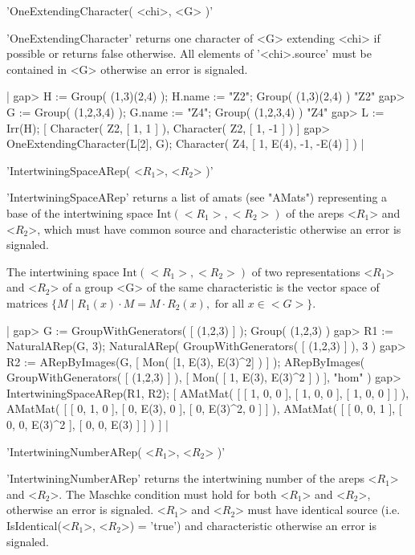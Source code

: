 
'OneExtendingCharacter( <chi>, <G> )'

'OneExtendingCharacter' returns one character 
of <G> extending <chi> if possible or returns false otherwise. 
All elements of '<chi>.source' must be 
contained in <G> otherwise an error is signaled.

|    gap> H := Group( (1,3)(2,4) ); H.name := "Z2";
    Group( (1,3)(2,4) )
    "Z2"
    gap> G := Group( (1,2,3,4) ); G.name := "Z4";
    Group( (1,2,3,4) )
    "Z4"
    gap> L := Irr(H);
    [ Character( Z2, [ 1, 1 ] ), Character( Z2, [ 1, -1 ] ) ]
    gap> OneExtendingCharacter(L[2], G);
    Character( Z4, [ 1, E(4), -1, -E(4) ] ) |


'IntertwiningSpaceARep( <$R_1$>, <$R_2$> )'

'IntertwiningSpaceARep' returns a list of amats (see "AMats") 
representing a base of the intertwining space $\mbox{Int}(<R_1>, <R_2>)$
of the areps <$R_1$> and <$R_2$>, which must have common source
and characteristic otherwise an error is signaled.

The intertwining space $\mbox{Int}(<R_1>, <R_2>)$ of two representations 
<$R_1$> and <$R_2$> of a group <G> of the same characteristic
is the vector space of matrices 
$\{M\mid R_1(x)\cdot M = M \cdot R_2(x),\mbox{ for all }x\in <G>\}$.

|    gap> G := GroupWithGenerators( [ (1,2,3) ] );
    Group( (1,2,3) )
    gap> R1 := NaturalARep(G, 3);
    NaturalARep( GroupWithGenerators( [ (1,2,3) ] ), 3 )
    gap> R2 := ARepByImages(G, [ Mon( [1, E(3), E(3)^2] ) ] );
    ARepByImages(
      GroupWithGenerators( [ (1,2,3) ] ),
      [ Mon( [ 1, E(3), E(3)^2 ] )
      ],
      "hom"
    )
    gap> IntertwiningSpaceARep(R1, R2);
    [ AMatMat( [ [ 1, 0, 0 ], [ 1, 0, 0 ], [ 1, 0, 0 ] ] ), 
      AMatMat( [ [ 0, 1, 0 ], [ 0, E(3), 0 ], [ 0, E(3)^2, 0 ] ] ), 
      AMatMat( [ [ 0, 0, 1 ], [ 0, 0, E(3)^2 ], [ 0, 0, E(3) ] ] ) ] |


'IntertwiningNumberARep( <$R_1$>, <$R_2$> )'

'IntertwiningNumberARep' returns the intertwining number of the 
areps <$R_1$> and <$R_2$>. The Maschke condition must hold for both 
<$R_1$> and <$R_2$>, otherwise an error is signaled.
<$R_1$> and <$R_2$> must have identical source 
(i.e. IsIdentical(<$R_1$>, <$R_2$>) = 'true') 
and characteristic otherwise an error is signaled.

